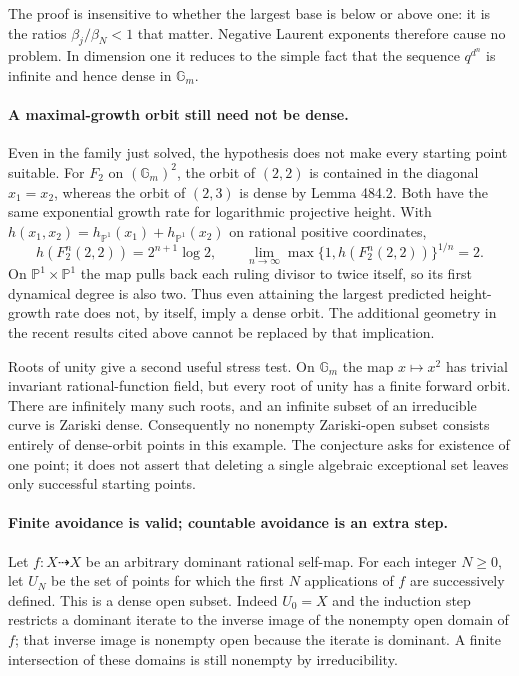 \documentclass[11pt]{article}
\begin{document}
The proof is insensitive to whether the largest base is below or above
one: it is the ratios $\beta_j/\beta_N<1$ that matter. Negative Laurent
exponents therefore cause no problem. In dimension one it reduces to the
simple fact that the sequence $q^{d^n}$ is infinite and hence dense in
$\mathbb G_m$.

\paragraph{A maximal-growth orbit still need not be dense.}
Even in the family just solved, the hypothesis does not make every
starting point suitable. For $F_2$ on $(\mathbb G_m)^2$, the orbit of
$(2,2)$ is contained in the diagonal $x_1=x_2$, whereas the orbit of
$(2,3)$ is dense by Lemma 484.2. Both have the same exponential growth
rate for logarithmic projective height. With
$h(x_1,x_2)=h_{\mathbb P^1}(x_1)+h_{\mathbb P^1}(x_2)$ on rational
positive coordinates,
\[
 h(F_2^n(2,2))=2^{n+1}\log2,
 \qquad \lim_{n\to\infty}\max\{1,h(F_2^n(2,2))\}^{1/n}=2.
\]
On $\mathbb P^1\times\mathbb P^1$ the map pulls back each ruling
divisor to twice itself, so its first dynamical degree is also two.
Thus even attaining the largest predicted height-growth rate does not,
by itself, imply a dense orbit. The additional geometry in the recent
results cited above cannot be replaced by that implication.

Roots of unity give a second useful stress test. On $\mathbb G_m$ the
map $x\mapsto x^2$ has trivial invariant rational-function field, but
every root of unity has a finite forward orbit. There are infinitely many
such roots, and an infinite subset of an irreducible curve is Zariski
dense. Consequently no nonempty Zariski-open subset consists entirely of
dense-orbit points in this example. The conjecture asks for existence of
one point; it does not assert that deleting a single algebraic exceptional
set leaves only successful starting points.

\paragraph{Finite avoidance is valid; countable avoidance is an extra step.}
Let $f:X\dashrightarrow X$ be an arbitrary dominant rational self-map.
For each integer $N\ge0$, let $U_N$ be the set of points for which the
first $N$ applications of $f$ are successively defined. This is a dense
open subset. Indeed $U_0=X$ and the induction step restricts a dominant
iterate to the inverse image of the nonempty open domain of $f$; that
inverse image is nonempty open because the iterate is dominant. A finite
intersection of these domains is still nonempty by irreducibility.
\end{document}
